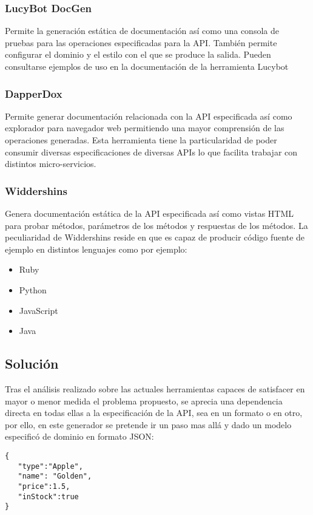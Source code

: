 \documentclass{svproc}
\begin{document}
\subsubsection{LucyBot DocGen}

Permite la generación estática de documentación así como una consola de pruebas para las operaciones especificadas para la API. También permite configurar el dominio y el estilo con el que se produce la salida. Pueden consultarse ejemplos de uso en la documentación de la herramienta Lucybot\cite{lucy}

\subsubsection{DapperDox}

Permite generar documentación relacionada con la API especificada así como explorador para navegador web permitiendo una mayor comprensión de las operaciones generadas. Esta herramienta tiene la particularidad de poder consumir diversas especificaciones de diversas APIs lo que facilita trabajar con distintos micro-servicios.  

\subsubsection{Widdershins}

Genera documentación estática de la API especificada así como vistas HTML para probar métodos, parámetros de los métodos y respuestas de los métodos. La peculiaridad de Widdershins\cite{widdershins} reside en que es capaz de producir código fuente de ejemplo en distintos lenguajes como por ejemplo:

\begin{itemize}
\item Ruby
\item Python
\item JavaScript
\item Java
\end{itemize} 


\subsection{Solución}

Tras el análisis realizado sobre las actuales herramientas capaces de satisfacer en mayor o menor medida el problema propuesto, se aprecia una dependencia directa en todas ellas a la especificación de la API, sea en un formato o en otro, por ello, en este generador se pretende ir un paso mas allá y dado un modelo especificó de dominio en formato JSON: 
\begin{lstlisting}
{
   "type":"Apple",
   "name": "Golden",
   "price":1.5,
   "inStock":true
}
\end{lstlisting}
\end{document}
